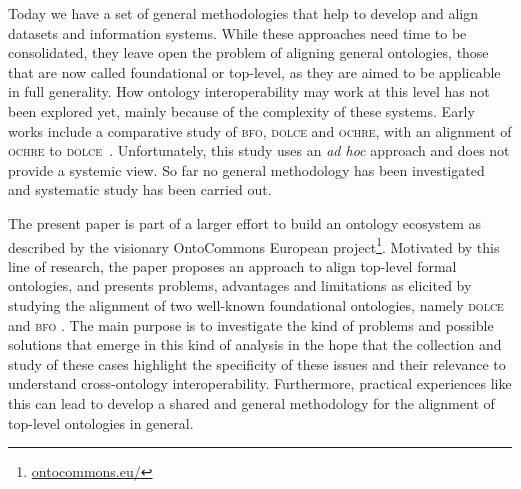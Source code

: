 \documentclass[ao]{iosart2x}
\newcommand{\nb}[1]{\textcolor{red}{$|$}\marginpar{\hspace*{-0cm}\parbox{20mm}{\scriptsize\raggedright\textcolor{red}{#1}}}}
\newcommand{\dolce}{{\textsc{dolce}}}
\newcommand{\bfo}{{\textsc{bfo}}}
\begin{document}
Today we have a set of general methodologies \citep{Euzenat2013, Jarrar2009, fernandezMethontology1997, gomezNeon2009} that help to develop and align datasets and information systems. While these approaches need time to be consolidated, they leave open the problem of aligning general ontologies, those that are now called foundational or top-level, as they are aimed to be applicable in full generality. 
How ontology interoperability may work at this level has not been explored yet, mainly because of the complexity of these systems. Early works include a comparative study of {\bfo}, {\dolce} and \textsc{ochre}, with an alignment of \textsc{ochre} to {\dolce}~\citep{D18}. 
Unfortunately, this study uses an \textit{ad hoc} approach and does not provide a systemic view. So far no general methodology has been investigated and systematic study has been carried out.

\medskip
The present paper is part of a larger effort to build an ontology ecosystem as described by the visionary OntoCommons European project\footnote{\url{ontocommons.eu/}}. Motivated by this line of research, the paper proposes an approach to align top-level formal ontologies, and presents problems, advantages and limitations as elicited by studying the alignment of two well-known foundational ontologies, namely {\dolce} \citep{borgoDOLCEDescriptiveOntology2022} and {\bfo} \citep{barryBasicFormalOntology2015}. The main purpose is to investigate the kind of problems and possible solutions that emerge in this kind of analysis in the hope that the collection and study of these cases highlight the specificity of these issues and their relevance to understand cross-ontology interoperability. Furthermore, practical experiences like this can lead to develop a shared and general methodology for the alignment of top-level ontologies in general.
\end{document}
